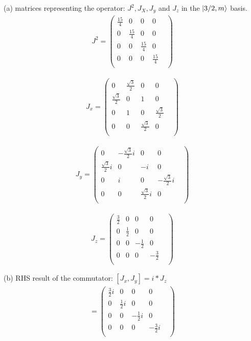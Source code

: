 \documentclass[10pt,a4paper]{article}
\begin{document}
(a) matrices representing the operator: $J^2, J_X, J_y$ and $J_z$ in the $\ket{3/2, m}$ basis.\begin{align}
J^2 = \begin{pmatrix}
\frac{15}{4}&0&0&0&\\0&\frac{15}{4}&0&0&\\0&0&\frac{15}{4}&0&\\0&0&0&\frac{15}{4}&\\\end{pmatrix}\end{align}

\begin{align}
J_x = \begin{pmatrix}
0&\frac{\sqrt{3}}{2}&0&0&\\\frac{\sqrt{3}}{2}&0&1&0&\\0&1&0&\frac{\sqrt{3}}{2}&\\0&0&\frac{\sqrt{3}}{2}&0&\\\end{pmatrix}\end{align}

\begin{align}
J_y = \begin{pmatrix}
0&-\frac{\sqrt{3}}{2}i&0&0&\\\frac{\sqrt{3}}{2}i&0&-i&0&\\0& i&0&-\frac{\sqrt{3}}{2}i&\\0&0&\frac{\sqrt{3}}{2}i&0&\\\end{pmatrix}\end{align}

\begin{align}
J_z = \begin{pmatrix}
\frac{3}{2}&0&0&0&\\0&\frac{1}{2}&0&0&\\0&0&-\frac{1}{2}&0&\\0&0&0&-\frac{3}{2}&\\\end{pmatrix}\end{align}

(b) RHS result of the commutator: $[J_x,J_y]=i*J_z$\begin{align}
[J_x,J_y] = \begin{pmatrix}
\frac{3}{2}i&0&0&0&\\0&\frac{1}{2}i&0&0&\\0&0&-\frac{1}{2}i&0&\\0&0&0&-\frac{3}{2}i&\\\end{pmatrix}\end{align}
\end{document}
